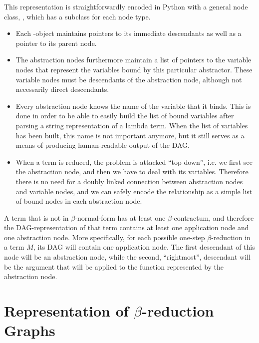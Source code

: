 This representation is straightforwardly encoded in Python with a general node
class, , which has a subclass for each node type.
\begin{itemize}
	\item Each -object maintains pointers to its immediate 
	descendants as well as a pointer to its parent node.
	
	\item The abstraction nodes furthermore maintain a list of pointers to the
	variable nodes that represent the variables bound by this particular abstractor.
	These variable nodes must be descendants of the abstraction node, although 
	not necessarily direct descendants.
	
	\item Every abstraction node knows the name of the variable that it binds.
	This is done in order to be able to easily build the list of bound 
	variables after parsing a string representation of a lambda term. When
	the list of variables has been built, this name is not important anymore, 
	but it still serves as a means of producing human-readable output of the DAG.
	
	\item When a term is reduced, the problem is attacked ``top-down'', i.e. we first
	see the abstraction node, and then we have to deal with its variables.
	Therefore there is no need for a doubly linked connection between abstraction
	nodes and variable nodes, and we can safely encode the relationship as a simple
	list of bound nodes in each abstraction node.
\end{itemize}

A term that is not in $\beta$-normal-form has at least one $\beta$-contractum,
and therefore the DAG-representation of that term contains at least one
application node and one abstraction node. More specifically, for each
possible one-step $\beta$-reduction in a term $M$, its DAG will contain one
application node. The first descendant of this node will be an abstraction
node, while the second, ``rightmost'', descendant will be the argument that
will be applied to the function represented by the abstraction node.



\section{Representation of $\beta$-reduction Graphs}

